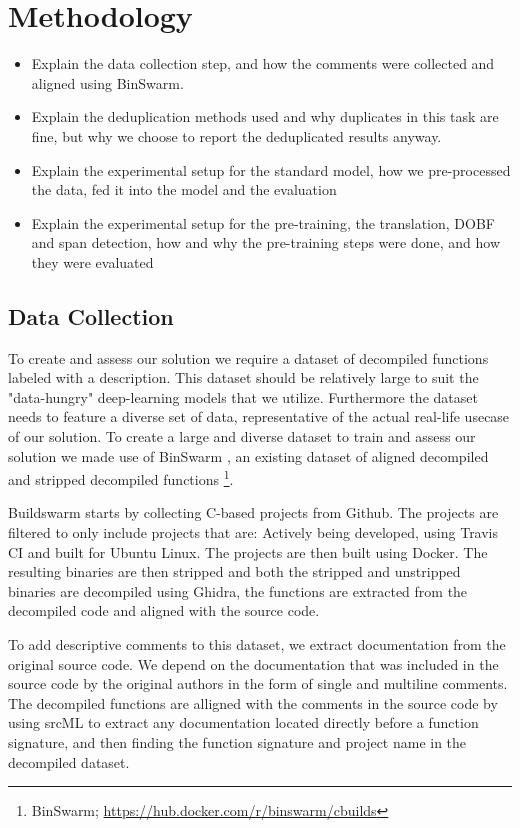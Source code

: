 \chapter{Methodology}
\label{methodology}
\begin{itemize}
    \item Explain the data collection step, and how the comments were collected and aligned using BinSwarm. 
    \item Explain the deduplication methods used and why duplicates in this task are fine, but why we choose to report the deduplicated results anyway.
    \item Explain the experimental setup for the standard model, how we pre-processed the data, fed it into the model and the evaluation 
    \item Explain the experimental setup for the pre-training, the translation, DOBF and span detection, how and why the pre-training steps were done, and how they were evaluated
\end{itemize}
\newpage
\section{Data Collection}
To create and assess our solution we require a dataset of decompiled functions labeled with a description. This dataset should be relatively large to suit the "data-hungry" deep-learning models that we utilize. Furthermore the dataset needs to feature a diverse set of data, representative of the actual real-life usecase of our solution. 
To create a large and diverse dataset to train and assess our solution we made use of BinSwarm \cite{InlinedFunc}, an existing dataset of aligned decompiled and stripped decompiled functions \footnote{BinSwarm; \url{https://hub.docker.com/r/binswarm/cbuilds}}.

Buildswarm starts by collecting C-based projects from Github. The projects are filtered to only include projects that are: Actively being developed, using Travis CI and built for Ubuntu Linux. The projects are then built using Docker. The resulting binaries are then stripped and both the stripped and unstripped binaries are decompiled using Ghidra, the functions are extracted from the decompiled code and aligned with the source code. 

To add descriptive comments to this dataset, we extract documentation from the original source code. We depend on the documentation that was included in the source code by the original authors in the form of single and multiline comments. The decompiled functions are alligned with the comments in the source code by using srcML to extract any documentation located directly before a function signature, and then finding the function signature and project name in the decompiled dataset.

